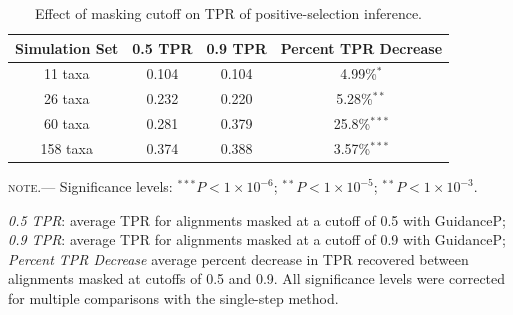 \documentclass[10pt]{article}
\begin{document}
\begin{table}
\caption {\label{tab:cutoffs} Effect of masking cutoff on TPR of positive-selection inference.}
\begin{tabular}{c c c c}
\hline\noalign{\smallskip}
Simulation Set & 0.5 TPR & 0.9 TPR & Percent TPR Decrease \\ 
\hline\noalign{\smallskip}
11 taxa & 0.104 & 0.104 & 4.99\%$^{\ast}$\\ 
26 taxa & 0.232 & 0.220 & 5.28\%$^{\ast\ast}$\\
60 taxa & 0.281 & 0.379 & 25.8\%$^{\ast\ast\ast}$\\
158 taxa & 0.374 & 0.388 & 3.57\%$^{\ast\ast\ast}$\\
\hline
\end{tabular}
\newline
\textsc{note.}--- Significance levels: $^{\ast\ast\ast} P < 1\times10^{-6}$; $^{\ast\ast} P < 1\times10^{-5}$; $^{\ast\ast} P < 1\times10^{-3}$. 

\textit{0.5 TPR}: average TPR for alignments masked at a cutoff of 0.5 with GuidanceP; \textit{0.9 TPR}: average TPR for alignments masked at a cutoff of 0.9 with GuidanceP; \textit{Percent TPR Decrease} average percent decrease in TPR recovered between alignments masked at cutoffs of 0.5 and 0.9. All significance levels were corrected for multiple comparisons with the single-step method.
\end{table}



	
\end{document}
